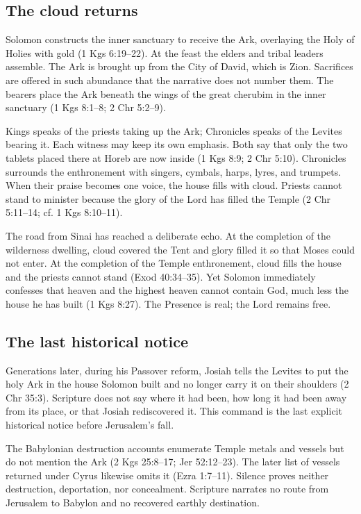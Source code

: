 \subsection{The cloud returns}

Solomon constructs the inner sanctuary to receive the Ark, overlaying the
Holy of Holies with gold (1 Kgs 6:19--22).  At the feast the elders and tribal
leaders assemble.  The Ark is brought up from the City of David, which is
Zion.  Sacrifices are offered in such abundance that the narrative does not
number them.  The bearers place the Ark beneath the wings of the great cherubim
in the inner sanctuary (1 Kgs 8:1--8; 2 Chr 5:2--9).

Kings speaks of the priests taking up the Ark; Chronicles speaks of the
Levites bearing it.  Each witness may keep its own emphasis.  Both say that
only the two tablets placed there at Horeb are now inside
(1 Kgs 8:9; 2 Chr 5:10).  Chronicles surrounds the enthronement with singers,
cymbals, harps, lyres, and trumpets.  When their praise becomes one voice, the
house fills with cloud.  Priests cannot stand to minister because the glory of
the Lord has filled the Temple (2 Chr 5:11--14; cf. 1 Kgs 8:10--11).

The road from Sinai has reached a deliberate echo.  At the completion of the
wilderness dwelling, cloud covered the Tent and glory filled it so that Moses
could not enter.  At the completion of the Temple enthronement, cloud fills the
house and the priests cannot stand (Exod 40:34--35).  Yet Solomon immediately
confesses that heaven and the highest heaven cannot contain God, much less the
house he has built (1 Kgs 8:27).  The Presence is real; the Lord remains free.

\subsection{The last historical notice}

Generations later, during his Passover reform, Josiah tells the Levites to put
the holy Ark in the house Solomon built and no longer carry it on their
shoulders (2 Chr 35:3).  Scripture does not say where it had been, how long it
had been away from its place, or that Josiah rediscovered it.  This command is
the last explicit historical notice before Jerusalem's fall.

The Babylonian destruction accounts enumerate Temple metals and vessels but
do not mention the Ark (2 Kgs 25:8--17; Jer 52:12--23).  The later list of
vessels returned under Cyrus likewise omits it (Ezra 1:7--11).  Silence proves
neither destruction, deportation, nor concealment.  Scripture narrates no route
from Jerusalem to Babylon and no recovered earthly destination.

